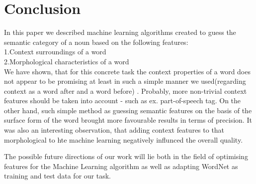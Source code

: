 \documentclass[letterpaper]{article}
\begin{document}


\section{Conclusion}
In this paper we described machine learning algorithms
created to guess the semantic category of a noun based on the following features:\\
1.Context surroundings of a word\\
2.Morphological characteristics of a word\\
We have shown, that for this concrete task the context properties of a word
does not appear to be promising at least in such a simple manner we 
used(regarding context as a word after and a word before) .
Probably, more non-trivial context features should be taken into account 
- such as ex. part-of-speech tag.
On the other hand, such simple method as guessing semantic features on the
basis of the surface form of the word brought more favourable %
results in terms of precision. It was also an interesting observation, that 
adding context features to that morphological to hte machine learning
negatively influnced the overall quality.

The possible future directions of our work will lie both in the field of
optimising features for the Machine Learning algorithm as well as 
adapting WordNet as training and test data for our task.

 
\end{document}
